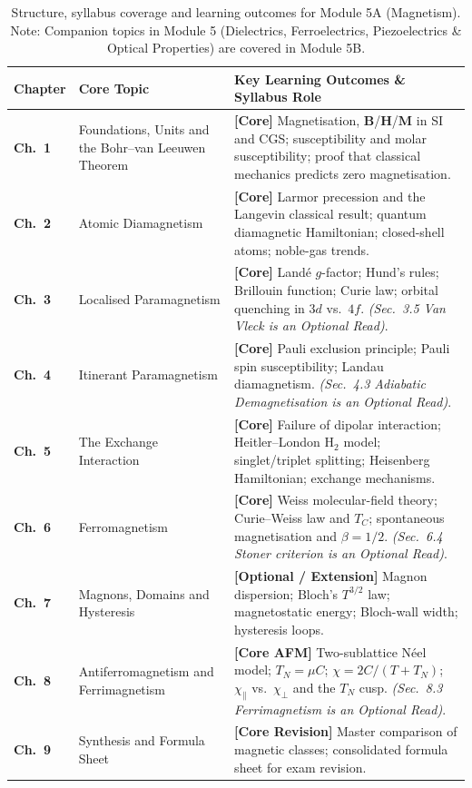 \documentclass[11pt,a4paper]{article}
\newcommand{\vb}[1]{\mathbf{#1}}
\begin{document}
\begin{table}[ht]
\centering
\small
\renewcommand{\arraystretch}{0.98}
\begin{tabular}{L{1.8cm} L{3.9cm} L{8.9cm}}
\toprule
\textbf{Chapter} & \textbf{Core Topic} & \textbf{Key Learning Outcomes \& Syllabus Role} \\
\midrule
\textbf{Ch.\ 1} & Foundations, Units and the Bohr--van Leeuwen Theorem & \textbf{[Core]} Magnetisation, $\vb{B}$/$\vb{H}$/$\vb{M}$ in SI and CGS; susceptibility and molar susceptibility; proof that classical mechanics predicts zero magnetisation. \\
\textbf{Ch.\ 2} & Atomic Diamagnetism & \textbf{[Core]} Larmor precession and the Langevin classical result; quantum diamagnetic Hamiltonian; closed-shell atoms; noble-gas trends. \\
\textbf{Ch.\ 3} & Localised Paramagnetism & \textbf{[Core]} Land\'e $g$-factor; Hund's rules; Brillouin function; Curie law; orbital quenching in $3d$ vs.\ $4f$. \emph{(Sec.~3.5 Van Vleck is an Optional Read)}. \\
\textbf{Ch.\ 4} & Itinerant Paramagnetism & \textbf{[Core]} Pauli exclusion principle; Pauli spin susceptibility; Landau diamagnetism. \emph{(Sec.~4.3 Adiabatic Demagnetisation is an Optional Read)}. \\
\textbf{Ch.\ 5} & The Exchange Interaction & \textbf{[Core]} Failure of dipolar interaction; Heitler--London $\text{H}_2$ model; singlet/triplet splitting; Heisenberg Hamiltonian; exchange mechanisms. \\
\textbf{Ch.\ 6} & Ferromagnetism & \textbf{[Core]} Weiss molecular-field theory; Curie--Weiss law and $T_C$; spontaneous magnetisation and $\beta = 1/2$. \emph{(Sec.~6.4 Stoner criterion is an Optional Read)}. \\
\textbf{Ch.\ 7} & Magnons, Domains and Hysteresis & \textbf{[Optional / Extension]} Magnon dispersion; Bloch's $T^{3/2}$ law; magnetostatic energy; Bloch-wall width; hysteresis loops. \\
\textbf{Ch.\ 8} & Antiferromagnetism and Ferrimagnetism & \textbf{[Core AFM]} Two-sublattice N\'eel model; $T_N = \mu C$; $\chi = 2C/(T+T_N)$; $\chi_\parallel$ vs.\ $\chi_\perp$ and the $T_N$ cusp. \emph{(Sec.~8.3 Ferrimagnetism is an Optional Read)}. \\
\textbf{Ch.\ 9} & Synthesis and Formula Sheet & \textbf{[Core Revision]} Master comparison of magnetic classes; consolidated formula sheet for exam revision. \\
\bottomrule
\end{tabular}
\caption{Structure, syllabus coverage and learning outcomes for Module 5A (Magnetism). Note: Companion topics in Module 5 (Dielectrics, Ferroelectrics, Piezoelectrics \& Optical Properties) are covered in Module 5B.}
\label{tab:syllabus_map}
\end{table}
\end{document}

